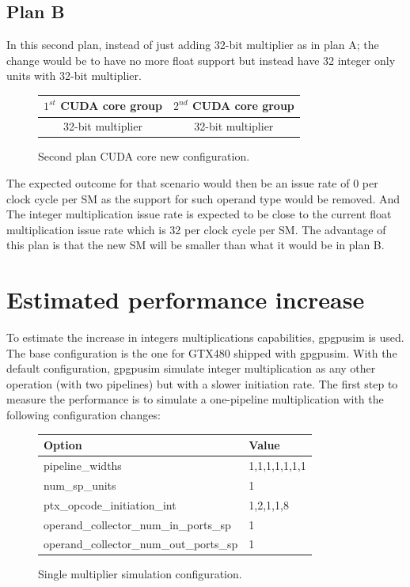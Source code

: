 \documentclass{report}
\begin{document}
   \subsection{Plan B}
   In this second plan, instead of just adding 32-bit multiplier as in plan A; the change would be to have no more float support but instead have 32 integer only units with 32-bit multiplier.
   \begin{figure}[H]
      \centering
       \begin{tabular}{ | c | c | }
    	    \hline
    	    $1^{st}$ CUDA core group & $2^{nd}$ CUDA core group \\ \hline
    	   32-bit multiplier & 32-bit multiplier \\ \hline
  	\end{tabular}
  	\captionsetup{justification=centering}
  	\caption{Second plan CUDA core new configuration.}
  	\label{fig:planB_cores}
   \end{figure}
   The expected outcome for that scenario would then be an issue rate of 0 per clock cycle per SM as the support for such operand type would be removed.
   And The integer multiplication issue rate is expected to be close to the current float multiplication issue rate which is 32 per clock cycle per SM.
   The advantage of this plan is that the new SM will be smaller than what it would be in plan B. 
   \section{Estimated performance increase}
    To estimate the increase in integers multiplications capabilities, gpgpusim
    is used. The base configuration is the one for GTX480 shipped with gpgpusim.
    With the default configuration, gpgpusim simulate integer multiplication as
    any other operation (with two pipelines) but with a slower initiation rate.
    The first step to measure the performance is to simulate a one-pipeline
    multiplication with the following configuration changes:
    \begin{figure}[H]
    \centering
       \begin{tabular}{ | l | l | }
            \hline
    	    Option & Value \\ \hline
    	    pipeline\_widths & 1,1,1,1,1,1,1 \\
            num\_sp\_units & 1 \\
            ptx\_opcode\_initiation\_int & 1,2,1,1,8 \\
            operand\_collector\_num\_in\_ports\_sp & 1 \\
            operand\_collector\_num\_out\_ports\_sp & 1 \\ \hline

  	    \end{tabular}
  	\captionsetup{justification=centering}
  	\caption{Single multiplier simulation configuration.}
  	\label{tab:1stconfig}
    \end{figure}
\end{document}
